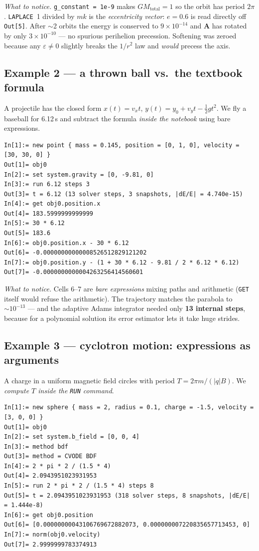 \documentclass[11pt]{article}
\newcommand{\kw}[1]{\texttt{\uppercase{#1}}}
\newcommand{\code}[1]{\texttt{#1}}
\begin{document}
\emph{What to notice.} \code{g\_constant = 1e-9} makes
$G M_{\text{total}} = 1$ so the orbit has period $2\pi$. \kw{laplace}~1
divided by $mk$ is the \emph{eccentricity vector}: $e = 0.6$ is read
directly off \code{Out[5]}. After $\sim$2 orbits the energy is conserved
to $9\times10^{-14}$ and $\mathbf A$ has rotated by only
$3\times10^{-10}$ --- no spurious perihelion precession. Softening was
zeroed because any $\varepsilon\ne 0$ slightly breaks the $1/r^2$ law
and \emph{would} precess the axis.

\subsection{Example 2 --- a thrown ball vs.\ the textbook formula}

A projectile has the closed form $x(t)=v_x t$,
$y(t)=y_0+v_y t-\tfrac12 g t^2$. We fly a baseball for 6.12\,s and
subtract the formula \emph{inside the notebook} using bare expressions.

\begin{lstlisting}
In[1]:= new point { mass = 0.145, position = [0, 1, 0], velocity = [30, 30, 0] }
Out[1]= obj0
In[2]:= set system.gravity = [0, -9.81, 0]
In[3]:= run 6.12 steps 3
Out[3]= t = 6.12 (13 solver steps, 3 snapshots, |dE/E| = 4.740e-15)
In[4]:= get obj0.position.x
Out[4]= 183.5999999999999
In[5]:= 30 * 6.12
Out[5]= 183.6
In[6]:= obj0.position.x - 30 * 6.12
Out[6]= -0.00000000000008526512829121202
In[7]:= obj0.position.y - (1 + 30 * 6.12 - 9.81 / 2 * 6.12 * 6.12)
Out[7]= -0.0000000000004263256414560601
\end{lstlisting}

\emph{What to notice.} Cells 6--7 are \emph{bare expressions} mixing
paths and arithmetic (\kw{get} itself would refuse the arithmetic). The
trajectory matches the parabola to $\sim\!10^{-13}$ --- and the adaptive
Adams integrator needed only \textbf{13 internal steps}, because for a
polynomial solution its error estimator lets it take huge strides.

\subsection{Example 3 --- cyclotron motion: expressions as arguments}

A charge in a uniform magnetic field circles with period
$T = 2\pi m/(|q|B)$. We \emph{compute $T$ inside the \kw{run} command}.

\begin{lstlisting}
In[1]:= new sphere { mass = 2, radius = 0.1, charge = -1.5, velocity = [3, 0, 0] }
Out[1]= obj0
In[2]:= set system.b_field = [0, 0, 4]
In[3]:= method bdf
Out[3]= method = CVODE BDF
In[4]:= 2 * pi * 2 / (1.5 * 4)
Out[4]= 2.0943951023931953
In[5]:= run 2 * pi * 2 / (1.5 * 4) steps 8
Out[5]= t = 2.0943951023931953 (318 solver steps, 8 snapshots, |dE/E| = 1.444e-8)
In[6]:= get obj0.position
Out[6]= [0.00000000043106769672882073, 0.000000007220835657713453, 0]
In[7]:= norm(obj0.velocity)
Out[7]= 2.9999999783374913
\end{lstlisting}
\end{document}
